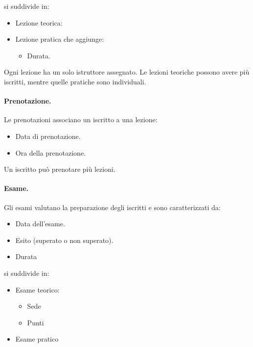\documentclass[10pt,twoside]{article}
\begin{document}
{    si suddivide in:

    \begin{itemize}
        \item Lezione teorica:
        \item Lezione pratica che aggiunge:
        \begin{itemize}
            \item Durata.
        \end{itemize}
    \end{itemize}

    Ogni lezione ha un solo istruttore assegnato. Le lezioni teoriche possono avere più iscritti, mentre quelle pratiche sono individuali.
    

    \paragraph{Prenotazione.}
    Le prenotazioni associano un iscritto a una lezione:

    \begin{itemize}
        \item Data di prenotazione. 
        \item Ora della prenotazione.
    \end{itemize}

    Un iscritto può prenotare più lezioni.
    

    \paragraph{Esame.}
    Gli esami valutano la preparazione degli iscritti e sono caratterizzati da:

    \begin{itemize}
            \item Data dell’esame.
            \item Esito (superato o non superato).
            \item Durata
    \end{itemize}

    si suddivide in: 

    \begin{itemize}
        \item Esame teorico:
        \begin{itemize}
            \item Sede
            \item Punti
        \end{itemize}
        \item Esame pratico
    \end{itemize}

}
\end{document}
